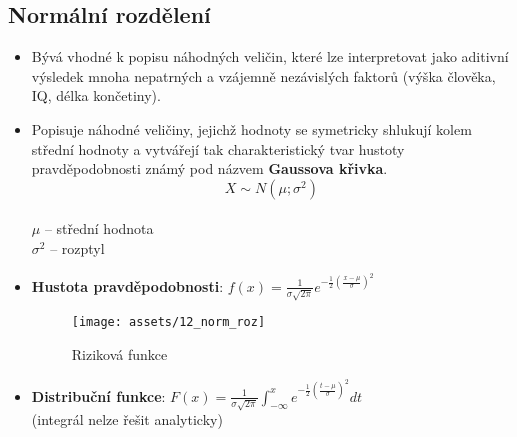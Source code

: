 \subsection{Normální rozdělení}
\begin{itemize}
    \item Bývá vhodné k popisu náhodných veličin, které lze interpretovat jako aditivní výsledek mnoha nepatrných a vzájemně nezávislých faktorů (výška člověka, IQ, délka končetiny).
    \item Popisuje náhodné veličiny, jejichž hodnoty se symetricky shlukují kolem střední hodnoty a vytvářejí tak charakteristický tvar hustoty pravděpodobnosti známý pod názvem \textbf{Gaussova křivka}. $$X \sim N (\mu;\sigma^2)$$  \\$\mu$ -- střední hodnota \\ $\sigma^2$ -- rozptyl
    \item \textbf{Hustota pravděpodobnosti}: $f(x) = \frac{1}{\sigma \sqrt{2\pi}} e^{-\frac{1}{2}({\frac{x - \mu}{\sigma}})^2}$
          \begin{figure}[H]
              \centering
              \texttt{[image: assets/12\_norm\_roz]}
              \caption{Riziková funkce}
          \end{figure}
    \item \textbf{Distribuční funkce}: $F(x) = \frac{1}{\sigma \sqrt{2\pi}} \int_{-\infty}^{x} e^{-\frac{1}{2}(\frac{t - \mu}{\sigma})^2} dt$\\ (integrál nelze řešit analyticky)
\end{itemize}

